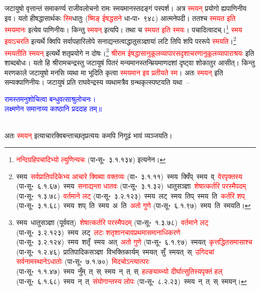 \begin{sloppypar}\justifying\noindent\hspace{10mm} जटायुषो वृत्तान्तं समाकर्ण्य राजीव\-लोचनो रामः स्मयमानस्तदङ्गं पस्पर्श। अत्र \textcolor{red}{स्मयन्} प्रयोगो ह्यपाणिनीय इव। यतो हीषद्धासार्थकः \textcolor{red}{स्मि}\-धातुः (\textcolor{red}{ष्मिङ् ईषद्धसने} धा॰पा॰~९४८) आत्मनेपदी। ततश्च \textcolor{red}{स्मयत इति स्मयमानः} इत्येव पाणिनीयः। किन्तु \textcolor{red}{स्मयन्} इत्यपि। तथा च \textcolor{red}{स्मयत इति स्मयः}। पचादित्वादच्।\footnote{\textcolor{red}{नन्दि\-ग्रहि\-पचादिभ्यो ल्युणिन्यचः} (पा॰सू॰~३.१.१३४) इत्यनेन।} \textcolor{red}{स्मय इवाऽचरति} इत्यर्थे क्विपि सर्वापहारि\-लोपे सनाद्यन्तत्वाद्धातु\-सञ्ज्ञायां लटि तिपि शपि पररूपे \textcolor{red}{स्मयति}।\footnote{स्मय~\arrow \textcolor{red}{सर्वप्राति\-पदिकेभ्य आचारे क्विब्वा वक्तव्यः} (वा॰~३.१.११)~\arrow स्मय~क्विँप्~\arrow स्मय~व्~\arrow \textcolor{red}{वेरपृक्तस्य} (पा॰सू॰~६.१.६७)~\arrow स्मय~\arrow \textcolor{red}{सनाद्यन्ता धातवः} (पा॰सू॰~३.१.३२)~\arrow धातुसञ्ज्ञा~\arrow \textcolor{red}{शेषात्कर्तरि परस्मैपदम्} (पा॰सू॰~१.३.७८)~\arrow \textcolor{red}{वर्तमाने लट्} (पा॰सू॰~३.२.१२३)~\arrow स्मय~लट्~\arrow स्मय~तिप्~\arrow स्मय~ति~\arrow \textcolor{red}{कर्तरि शप्‌} (पा॰सू॰~३.१.६८)~\arrow स्मय~शप्~ति~\arrow स्मय~अ~ति~\arrow \textcolor{red}{अतो गुणे} (पा॰सू॰~६.१.९७)~\arrow स्मय~ति~\arrow स्मयति।} \textcolor{red}{स्मयतीति स्मयन्} इत्यर्थे शतृ\-प्रयोगे न दोषः।\footnote{स्मय~\arrow धातुसञ्ज्ञा (पूर्ववत्)~\arrow \textcolor{red}{शेषात्कर्तरि परस्मैपदम्} (पा॰सू॰~१.३.७८)~\arrow \textcolor{red}{वर्तमाने लट्} (पा॰सू॰~३.२.१२३)~\arrow स्मय~लट्~\arrow \textcolor{red}{लटः शतृशानचावप्रथमा\-समानाधिकरणे} (पा॰सू॰~३.२.१२४)~\arrow स्मय~शतृँ~\arrow स्मय~अत्~\arrow \textcolor{red}{अतो गुणे} (पा॰सू॰~६.१.९७)~\arrow स्मयत्~\arrow \textcolor{red}{कृत्तद्धित\-समासाश्च} (पा॰सू॰~१.२.४६)~\arrow प्रातिपादिक\-सञ्ज्ञा~\arrow विभक्ति\-कार्यम्~\arrow स्मयत्~सुँ~\arrow स्मयत्~स्~\arrow \textcolor{red}{उगिदचां सर्वनामस्थानेऽधातोः} (पा॰सू॰~७.१.७०)~\arrow \textcolor{red}{मिदचोऽन्त्यात्परः} (पा॰सू॰~१.१.४७)~\arrow स्मय~नुँम्~त्~स्~\arrow स्मय~न्~त्~स्~\arrow \textcolor{red}{हल्ङ्याब्भ्यो दीर्घात्सुतिस्यपृक्तं हल्} (पा॰सू॰~६.१.६८)~\arrow स्मय~न्~त्~\arrow \textcolor{red}{संयोगान्तस्य लोपः} (पा॰सू॰~८.२.२३)~\arrow स्मय~न्~त्~स्~\arrow स्मयन्।} \textcolor{red}{श्रीराम ईषद्धासानुकूल\-व्यापार\-सदृशाचरणानुकूल\-व्यापाराश्रयः} इति शाब्द\-बोधः। यतो हि श्रीरामचन्द्रस्तु जटायुषं पितरं मन्यमानस्तन्म्रियमाण\-दशां दृष्ट्वा शोकातुर आसीत्। किन्तु मरण\-काले जटायुषो मनसि व्यथा मा भूदिति कृत्वा \textcolor{red}{स्मयमान इव प्रतीयते स्म}। अतः \textcolor{red}{स्मयन्} इति सम्यक्पाणिनीयः। जटायुषं प्रति राघवेन्द्रस्य व्यथामत्रैव ग्रन्थकृत्स्पष्टयति यथा~–\end{sloppypar}
\centering\textcolor{blue}{रामस्तमनुशोचित्वा बन्धुवत्साश्रुलोचनः।\nopagebreak\\
लक्ष्मणेन समानाय्य काष्ठानि प्रददाह तम्॥}\nopagebreak\\
\\
\begin{sloppypar}\justifying\noindent अतः \textcolor{red}{स्मयन्} इत्याचार\-क्विबन्ताच्छतृ\-प्रत्ययः कमपि निगूढं भावं व्यञ्जयति।\end{sloppypar}
